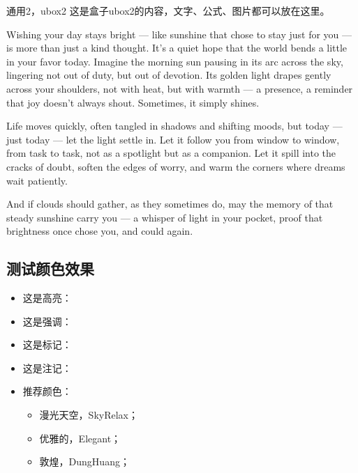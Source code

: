 \begin{ubox2}{通用2，ubox2}
	这是盒子ubox2的内容，文字、公式、图片都可以放在这里。
	
	Wishing your day stays bright — like sunshine that chose to stay just for you — is more than just a kind thought. It’s a quiet hope that the world bends a little in your favor today. Imagine the morning sun pausing in its arc across the sky, lingering not out of duty, but out of devotion. Its golden light drapes gently across your shoulders, not with heat, but with warmth — a presence, a reminder that joy doesn’t always shout. Sometimes, it simply shines.
	
	Life moves quickly, often tangled in shadows and shifting moods, but today — just today — let the light settle in. Let it follow you from window to window, from task to task, not as a spotlight but as a companion. Let it spill into the cracks of doubt, soften the edges of worry, and warm the corners where dreams wait patiently.
	
	And if clouds should gather, as they sometimes do, may the memory of that steady sunshine carry you — a whisper of light in your pocket, proof that brightness once chose you, and could again.
\end{ubox2}

\subsection{测试颜色效果}
\begin{itemize}
	\item 这是高亮：
	\item 这是强调：
	\item 这是标记：
	\item 这是注记：
	\item 推荐颜色：
	\begin{itemize}
		\item 漫光天空，SkyRelax；
		\item 优雅的，Elegant；
		\item 敦煌，DungHuang；
	\end{itemize}
\end{itemize}